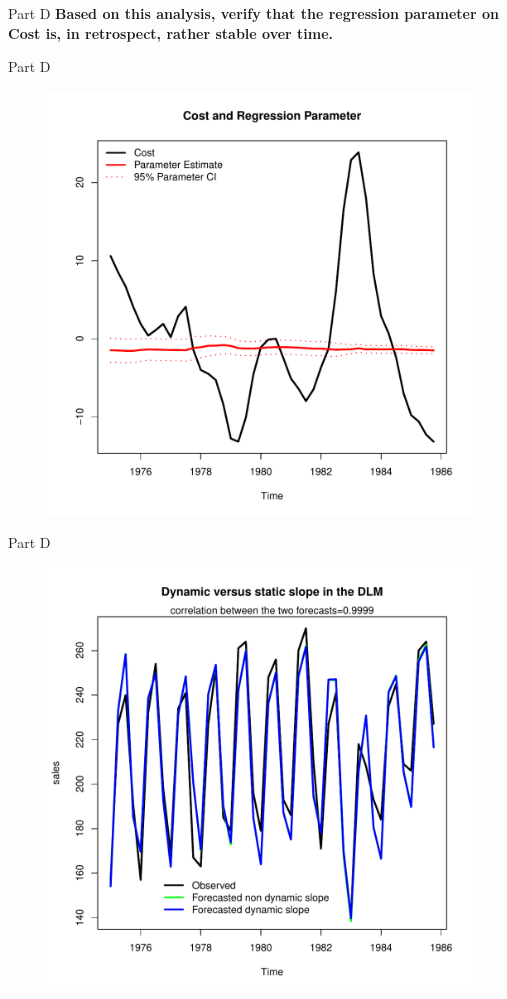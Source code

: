 \documentclass[14pt]{beamer}
\begin{document}
	\begin{frame}{Part D}
		\textbf{Based on this analysis, verify that the regression parameter on Cost is, in retrospect, rather stable over time.}
	\end{frame}

	\begin{frame}{Part D}
		\begin{figure}
			\centering
			\includegraphics[width=0.65\linewidth]{CostandRegressionParm}
		\end{figure}
	\end{frame}

	\begin{frame}{Part D}
		\begin{figure}
			\centering
			\includegraphics[width=0.7\linewidth]{DynVsStaticSlope}
		\end{figure}
	\end{frame}
\end{document}
